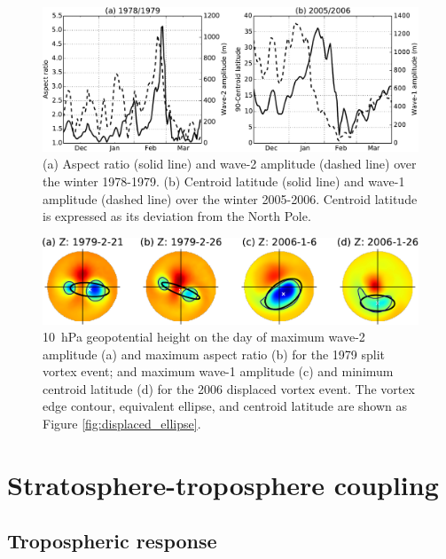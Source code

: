 \begin{figure}
 \centering
 \noindent\includegraphics[width=\textwidth]{figures/chapter-moments/waves_moments_ts.pdf}
 \caption[Wave amplitude and moment diagnostic time series.]{(a) Aspect ratio
   (solid line) and wave-2 amplitude (dashed line) over the winter
   1978-1979. (b) Centroid latitude (solid line) and wave-1 amplitude (dashed
   line) over the winter 2005-2006. Centroid latitude is expressed as its
   deviation from the North Pole.}
 \label{fig:wave_moments_ts}
\end{figure}

\begin{figure}
 \centering
 \noindent\includegraphics[width=\textwidth]{figures/chapter-moments/wave_moment_vortices.pdf}
 \caption[Comparison of vortex at maximum of moment diagnostics and wave
 amplitudes.]{10~hPa geopotential height on the day of maximum wave-2 amplitude
   (a) and maximum aspect ratio (b) for the 1979 split vortex event; and maximum
   wave-1 amplitude (c) and minimum centroid latitude (d) for the 2006 displaced
   vortex event. The vortex edge contour, equivalent ellipse, and centroid
   latitude are shown as Figure \ref{fig:displaced_ellipse}.}
 \label{fig:wave_moments_vortex}
\end{figure}


\section{Stratosphere-troposphere coupling}
\label{sec:moments_analysis}

\subsection{Tropospheric response}

